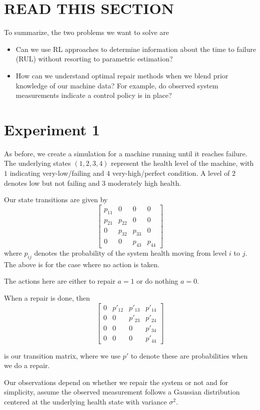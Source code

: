 \documentclass[english]{article}
\numberwithin{equation}{section}
\begin{document}
\section*{READ THIS SECTION}

To summarize, the two problems we want to solve are
\begin{itemize}
	\item Can we use RL approaches to determine information about the time to failure (RUL) without resorting to parametric estimation?
	\item How can we understand optimal repair methods when we blend prior knowledge of our machine data? For example, do observed system measurements indicate a control policy is in place?
\end{itemize}
\section*{Experiment 1}
As before, we create a simulation for a machine running until it reaches failure. The underlying states $(1,2,3,4)$ represent the health level of the machine, with $1$ indicating very-low/failing and $4$ very-high/perfect condition. A level of $2$ denotes low but not failing and $3$ moderately high health.

Our state transitions are given by 
$$
\begin{bmatrix}
	p_{11} & 0 & 0 & 0 \\
	p_{21} & p_{22} & 0 & 0 \\
	0 & p_{32} & p_{33} & 0 \\
	0 & 0 & p_{43} & p_{44}
\end{bmatrix}
$$
where $p_{ij}$ denotes the probability of the system health moving from level $i$ to $j$. The above is for the case where no action is taken.

The actions here are either to repair $a=1$ or do nothing $a=0$.

When a repair is done, then
$$
\begin{bmatrix}
    0 & p'_{12} & p'_{13} & p'_{14} \\
	0 & 0 & p'_{23} & p'_{24} \\
	0 & 0 & 0 & p'_{34} \\
	0 & 0 & 0 & p'_{44}
\end{bmatrix}
$$

is our transition matrix, where we use $p'$ to denote these are probabilities when we do a repair.

Our observations depend on whether we repair the system or not and for simplicity, assume the observed measurement follows a Gaussian distribution centered at the underlying health state with variance $\sigma^2$.
\end{document}
